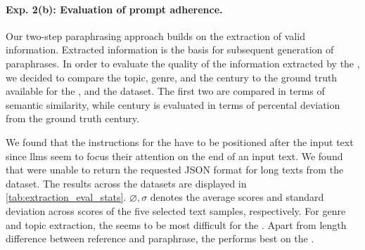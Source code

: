 


\paragraph{Exp. 2(b): Evaluation of prompt adherence.}
Our two-step paraphrasing approach builds on the extraction of valid information.
Extracted information is the basis for subsequent generation of paraphrases.
In order to evaluate the quality of the information extracted by the \pextractor{}, we decided to compare the topic, genre, and the century to the ground truth available for the \dataBlog{}, \dataGutenberg{} and the \dataStudent{} dataset.
The first two are compared in terms of semantic similarity, while century is evaluated in terms of percental deviation from the ground truth century.

We found that the instructions for the \pextractor{} have to be positioned after the input text since \acp{llm} seem to focus their attention on the end of an input text.
We found that \pextractor{} were unable to return the requested JSON format for long texts from the \dataGutenberg{} dataset.
The results across the datasets are displayed in \autoref{tab:extraction_eval_stats}.
$\diameter, \sigma$ denotes the average scores and standard deviation across scores of the five selected text samples, respectively.
For genre and topic extraction, the \dataBlog{} seems to be most difficult for the \pextractor{}.
Apart from length difference between reference and paraphrase, the \pextractor{} performs best on the \dataGutenberg{}.

